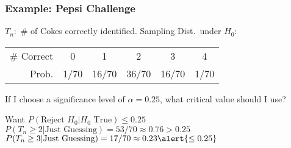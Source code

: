 \documentclass{beamer}
\begin{document}
\begin{frame}
\frametitle{Example: Pepsi Challenge }
$T_n\colon$ \# of Cokes correctly identified. Sampling Dist.\ under $H_0$:
		\begin{center}
		\begin{tabular}{rccccc}
		\hline
		\# Correct & 0 & 1 & 2 & 3 & 4\\
		Prob.&1/70 & 16/70 & 36/70 & 16/70 &1/70\\
		\hline
		\end{tabular}
	\end{center}
	\alert{If I choose a significance level of $\alpha =0.25$, what critical value should I use?}
	\pause
	
	\vspace{2em}
	Want $P(\mbox{Reject } H_0|H_0 \mbox{ True})\leq 0.25$\\ 
	$P(T_n \geq 2 |\mbox{Just Guessing}) = 53/70 \approx 0.76 > 0.25$ 
	$P(T_n \geq 3 |\mbox{Just Guessing}) = 17/70 \approx 0.23 \alert{\leq 0.25}$ 
\end{frame}
\end{document}
